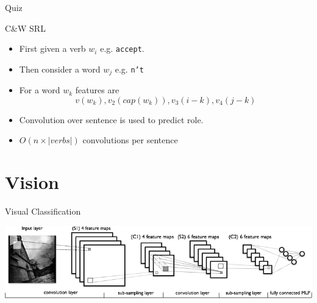 \documentclass{beamer}
\begin{document}
\begin{frame}{Quiz}
\begin{itemize}
\begin{frame}{C\&W SRL }
  \begin{itemize}
  \item   First given a verb $w_i$ e.g. \texttt{accept}.
    \air 
  \item  Then consider a word $w_j$ e.g. \texttt{n't}
    \air
  \item  For a word $w_k$ features are 
    \[v(w_k), v_2(cap(w_k)), v_3(i-k), v_4(j-k)\]

    \air
  \item Convolution over sentence is used to predict role.
    \air 
  \item $O(n \times |verbs|)$ convolutions per sentence
  \end{itemize}
\end{frame}

{

}

{

}


{

}

{

}

{

}

\section{Vision}
\begin{frame}{Visual Classification}
  \begin{center}
    \includegraphics[width=\textwidth]{mylenet}
  \end{center}
\end{frame}



\end{itemize}
\end{frame}
\end{document}
